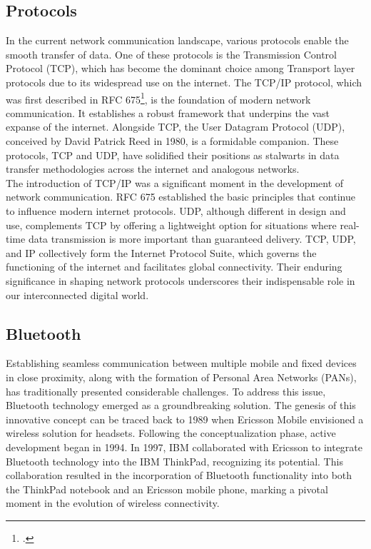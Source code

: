 \subsection{Protocols}
In the current network communication landscape, various protocols enable the smooth transfer of data. One of these protocols is the 
Transmission Control Protocol (TCP), which has become the dominant choice among Transport layer protocols due to its widespread use on the internet. 
The TCP/IP protocol, which was first described in RFC 675\footcite{rfc_675}, is the foundation of modern network communication. It establishes a robust framework that 
underpins the vast expanse of the internet. Alongside TCP, the User Datagram Protocol (UDP), conceived by David Patrick Reed in 1980, is a formidable companion. 
These protocols, TCP and UDP, have solidified their positions as stalwarts in data transfer methodologies across the internet and analogous networks.\\

The introduction of TCP/IP was a significant moment in the development of network communication. RFC 675 established the basic principles that continue 
to influence modern internet protocols. UDP, although different in design and use, complements TCP by offering a lightweight option for situations where 
real-time data transmission is more important than guaranteed delivery. TCP, UDP, and IP collectively form the Internet Protocol Suite, which governs the 
functioning of the internet and facilitates global connectivity. Their enduring significance in shaping network protocols underscores their indispensable role 
in our interconnected digital world.

\subsection{Bluetooth}
Establishing seamless communication between multiple mobile and fixed devices in close proximity, along with the formation of Personal Area Networks (PANs), 
has traditionally presented considerable challenges. To address this issue, Bluetooth technology emerged as a groundbreaking solution. The genesis of this 
innovative concept can be traced back to 1989 when Ericsson Mobile envisioned a wireless solution for headsets. Following the conceptualization phase, active 
development began in 1994. In 1997, IBM collaborated with Ericsson to integrate Bluetooth technology into the IBM ThinkPad, recognizing its potential. 
This collaboration resulted in the incorporation of Bluetooth functionality into both the ThinkPad notebook and an Ericsson mobile phone, marking a pivotal moment 
in the evolution of wireless connectivity.\\

